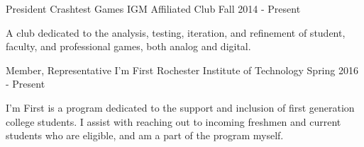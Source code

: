 


\begin{cventries}


\cventry
{President} %
{Crashtest Games} %
{IGM Affiliated Club} %
{Fall 2014 - Present} %
{ %
\begin{cvitems}
\item {A club dedicated to the analysis, testing, iteration, and refinement of student, faculty, and professional games, both analog and digital.}
\end{cvitems}
}


\cventry
{Member, Representative} %
{I'm First} %
{Rochester Institute of Technology} %
{Spring 2016 - Present} %
{ %
\begin{cvitems}
\item {I'm First is a program dedicated to the support and inclusion of first generation college students. I assist with reaching out to incoming freshmen and current students who are eligible, and am a part of the program myself.}
\end{cvitems}
}





\end{cventries}